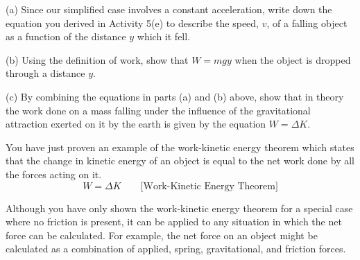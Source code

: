 (a) Since our simplified case involves a constant acceleration, write down the
equation you derived in Activity 5(e) to describe the speed, $v$, of a falling
object as a function of the distance $y$ which it fell.
\vspace{10mm}

(b) Using the definition of work, show that $W = mgy$ when the object is dropped
through a distance $y$.
\vspace{20mm}

(c) By combining the equations in parts (a) and (b) above, show that in theory
the work done on a mass falling under the influence of the gravitational attraction
exerted on it by the earth is given by the equation \(W = \Delta  K\).
\vspace{20mm}

You have just proven an example of the work-kinetic energy theorem which 
states that the change in kinetic energy of an object is equal to the net work 
done by all the forces acting on it.
\[
W=\Delta K\qquad \mbox{[Work-Kinetic Energy Theorem]}\]


Although you have only shown the work-kinetic energy theorem for a special 
case where no friction is present, it can be applied to any situation in which 
the net force can be calculated. For example, the net force on an object might 
be calculated as a combination of applied, spring, gravitational, and friction 
forces.

